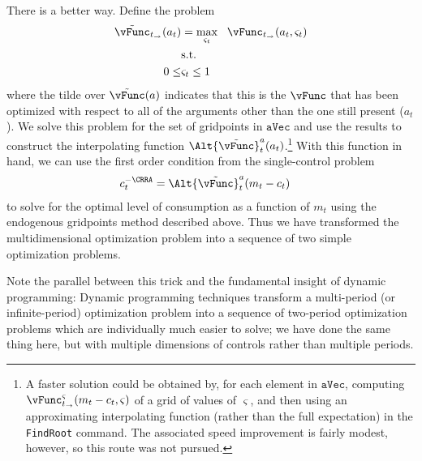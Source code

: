 There is a better way.  Define the problem
\providecommand{\Opt}{}
\renewcommand{\Opt}{\tilde}
\providecommand{\vOpt}{}
\renewcommand{\vOpt}{\overset{*}{\vFunc}}
\begin{equation}\begin{gathered}\begin{aligned}
      \Opt{\vFunc}_{{t_\rightarrow}}({a}_{t})  & = \max_{\varsigma_{t}} ~~  \vFunc_{t_\rightarrow}({a}_{t},\varsigma_{t})
      \\      & \text{s.t.} \nonumber
      \\      0 \leq & \varsigma_{t} \leq 1
    \end{aligned}\end{gathered}\end{equation}
where the tilde over $\Opt{\vFunc}(a)$ indicates that this is the $\vFunc$ that has been optimized with respect to all of the arguments other than the one still present (${a}_{t}$).  We solve this problem for the set of gridpoints in \ensuremath{\mathtt{aVec}} and use the results to construct the interpolating function $\Alt{\Opt{\vFunc}}_{t}^{a}({a}_{t})$.\footnote{A faster solution could be obtained by, for each element in \ensuremath{\mathtt{aVec}}, computing $\vFunc_{t_\rightarrow}^{\varsigma}({m}_{t}-{c}_{t},\varsigma)$ of a grid of values of $\varsigma$, and then using an approximating interpolating function (rather than the full expectation) in the \texttt{FindRoot} command.  The associated speed improvement is fairly modest, however, so this route was not pursued.}  With this function in hand, we can use the first order condition from the single-control problem
\begin{equation*}\begin{gathered}\begin{aligned}
      {c}_{t}^{-\CRRA}  & = \Alt{\Opt{\vFunc}}_{t}^{{a}}({m}_{t}-{c}_{t})
    \end{aligned}\end{gathered}\end{equation*}
to solve for the optimal level of consumption as a function of ${m}_{t}$ using the endogenous gridpoints method described above.  Thus we have transformed the multidimensional optimization problem into a sequence of two simple optimization problems.

Note the parallel between this trick and the fundamental insight of dynamic programming: Dynamic programming techniques transform a multi-period (or infinite-period) optimization problem into a sequence of two-period optimization problems which are individually much easier to solve; we have done the same thing here, but with multiple dimensions of controls rather than multiple periods.

